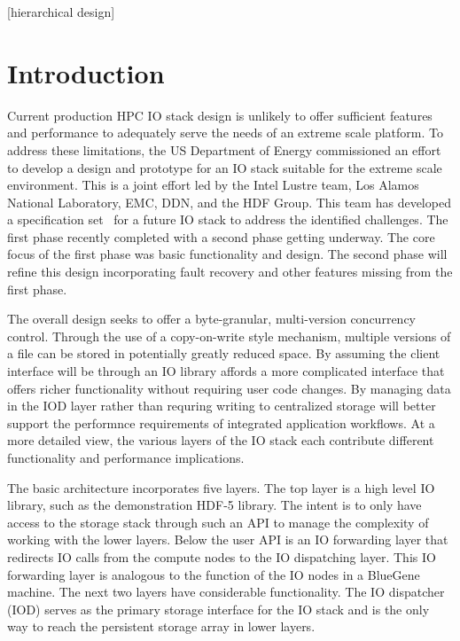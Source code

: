 \documentclass[conference]{sig-alt-gov2}
\begin{document}
[hierarchical design]


\section{Introduction}

Current production HPC IO stack design is unlikely to offer sufficient features
and performance to adequately serve the needs of an extreme scale platform. To
address these limitations, the US Department of Energy commissioned an effort
to develop a design and prototype for an IO stack suitable for the extreme
scale environment. This is a joint effort led by the Intel Lustre team, Los
Alamos National Laboratory, EMC, DDN, and the HDF Group. This team has
developed a specification set~\cite{fastforward:2014:docs} for a future IO
stack to address the identified challenges. The first phase recently completed
with a second phase getting underway. The core focus of the first phase was
basic functionality and design. The second phase will refine this design
incorporating fault recovery and other features missing from the first phase.

The overall design seeks to offer a byte-granular, multi-version concurrency
control. Through the use of a copy-on-write style mechanism, multiple versions
of a file can be stored in potentially greatly reduced space. By assuming the
client interface will be through an IO library affords a more complicated
interface that offers richer functionality without requiring user code changes.
By managing data in the IOD layer rather than requring writing to centralized
storage will better support the performnce requirements of integrated
application workflows. At a more detailed view, the various layers of the IO
stack each contribute different functionality and performance implications.

The basic architecture incorporates five layers. The top layer is a high level
IO library, such as the demonstration HDF-5 library. The intent is to only have
access to the storage stack through such an API to manage the complexity of
working with the lower layers. Below the user API is an IO forwarding layer
that redirects IO calls from the compute nodes to the IO dispatching layer.
This IO forwarding layer is analogous to the function of the IO nodes in a
BlueGene machine. The next two layers have considerable functionality. The IO
dispatcher (IOD) serves as the primary storage interface for the IO stack and
is the only way to reach the persistent storage array in lower layers.
\end{document}
